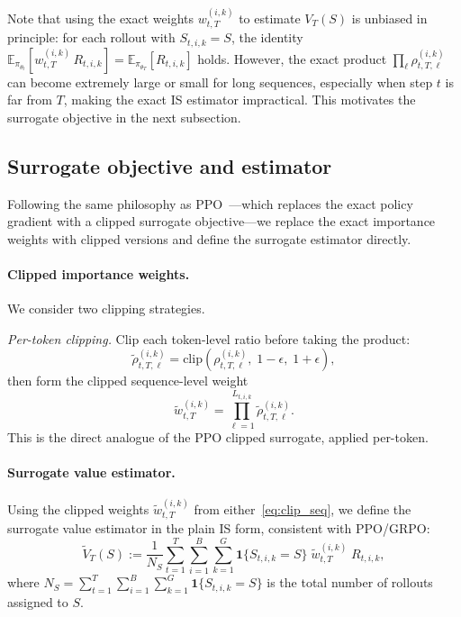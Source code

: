 Note that using the exact weights $w_{t,T}^{(i,k)}$ to estimate $V_T(S)$ is unbiased in principle: for each rollout with $S_{t,i,k} = S$, the identity $\mathbb{E}_{\pi_{\theta_t}}\!\left[w_{t,T}^{(i,k)}\, R_{t,i,k}\right] = \mathbb{E}_{\pi_{\theta_T}}\!\left[R_{t,i,k}\right]$ holds.  However, the exact product $\prod_\ell \rho_{t,T,\ell}^{(i,k)}$ can become extremely large or small for long sequences, especially when step $t$ is far from $T$, making the exact IS estimator impractical.  This motivates the surrogate objective in the next subsection.

\subsection{Surrogate objective and estimator}
\label{app:iw:surrogate}

Following the same philosophy as PPO~\citep{schulman2017proximal}---which replaces the exact policy gradient with a clipped surrogate objective---we replace the exact importance weights with clipped versions and define the surrogate estimator directly.

\paragraph{Clipped importance weights.}
We consider two clipping strategies.

\textit{Per-token clipping.}  Clip each token-level ratio before taking the product:
\begin{equation}
\label{eq:clip_token}
    \tilde{\rho}_{t,T,\ell}^{(i,k)} = \mathrm{clip}\!\left(\rho_{t,T,\ell}^{(i,k)},\; 1 - \epsilon,\; 1 + \epsilon\right),
\end{equation}
then form the clipped sequence-level weight
\begin{equation}
\label{eq:clip_seq}
    \tilde{w}_{t,T}^{(i,k)} = \prod_{\ell=1}^{L_{t,i,k}} \tilde{\rho}_{t,T,\ell}^{(i,k)}.
\end{equation}
This is the direct analogue of the PPO clipped surrogate, applied per-token.


\paragraph{Surrogate value estimator.}
Using the clipped weights $\tilde{w}_{t,T}^{(i,k)}$ from either~\eqref{eq:clip_seq}, we define the surrogate value estimator in the plain IS form, consistent with PPO/GRPO:
\begin{equation}
\label{eq:iw_surrogate}
    \tilde{V}_T(S) := \frac{1}{N_S}\sum_{t=1}^{T} \sum_{i=1}^{B} \sum_{k=1}^{G} \mathbf{1}\{S_{t,i,k} = S\}\; \tilde{w}_{t,T}^{(i,k)}\; R_{t,i,k},
\end{equation}
where $N_S = \sum_{t=1}^{T} \sum_{i=1}^{B} \sum_{k=1}^{G} \mathbf{1}\{S_{t,i,k} = S\}$ is the total number of rollouts assigned to $S$.

